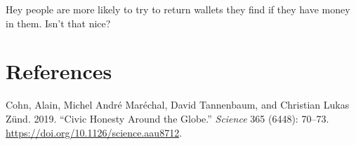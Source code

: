 \documentclass[12pt,halfline,a4paper,]{ouparticle}
\begin{document}
Hey people are more likely to try to return wallets they find if they
have money in them. Isn't that nice?

\hypertarget{references}{%
\section*{References}\label{references}}

\hypertarget{refs}{}
\leavevmode\hypertarget{ref-cohnCivicHonestyGlobe2019}{}%
Cohn, Alain, Michel André Maréchal, David Tannenbaum, and Christian
Lukas Zünd. 2019. ``Civic Honesty Around the Globe.'' \emph{Science} 365
(6448): 70--73. \url{https://doi.org/10.1126/science.aau8712}.
\end{document}
